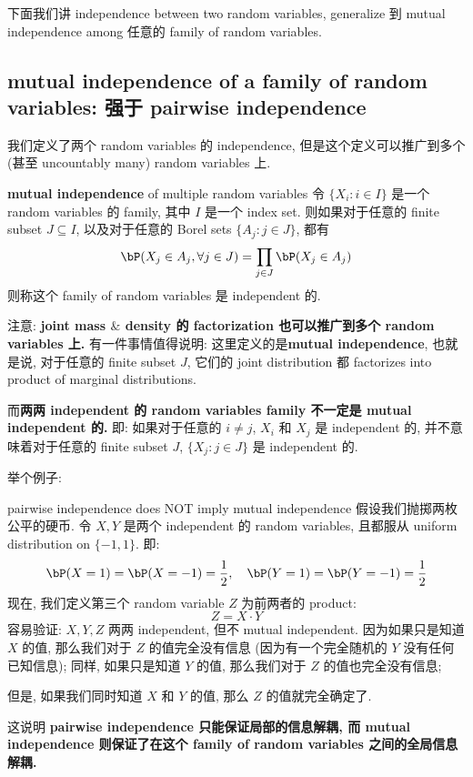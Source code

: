 下面我们讲 independence between two random variables, generalize 
到 mutual independence among 任意的 family of random variables.


\subsection{mutual independence of a family of random variables: 强于 pairwise independence}
我们定义了两个 random variables 的 independence, 
但是这个定义可以推广到多个 (甚至 uncountably many) random variables 上.
\begin{definition}{\textbf{mutual independence} of multiple random variables}
    令 \(\{X_i: i \in I\}\) 是一个 random variables 的 family, 
    其中 \(I\) 是一个 index set. 
    则如果对于任意的 finite subset \(J \subseteq I\), 
    以及对于任意的 Borel sets \(\{A_j: j \in J\}\), 都有
    \[
    \bP(X_j \in A_j, \forall j \in J) = \prod_{j\in J} \bP(X_j \in A_j)
    \]
    则称这个 family of random variables 是 independent 的.
\end{definition}
注意: \textbf{joint mass $\&$ density 的 factorization 也可以推广到多个 random variables 上.} 
有一件事情值得说明: 
这里定义的是\textbf{mutual independence}, 也就是说, 对于任意的 finite subset \(J\),
它们的 joint distribution 都 factorizes into product of marginal distributions.

而\textbf{两两 independent 的 random variables family 不一定是 mutual independent 的.}
即: 如果对于任意的 \(i \neq j\), \(X_i\) 和 \(X_j\) 是 independent 的,
并不意味着对于任意的 finite subset \(J\), \(\{X_j: j \in J\}\) 是 independent 的. 

举个例子: 

\begin{example}{pairwise independence does NOT imply mutual independence}
假设我们抛掷两枚公平的硬币.
令 $X, Y$ 是两个 independent 的 random variables, 
且都服从 uniform distribution on $\{-1, 1\}$. 即:
$$
\bP(X=1) = \bP(X=-1) = \frac{1}{2}, \quad \bP(Y=1) = \bP(Y=-1) = \frac{1}{2}
$$
现在, 我们定义第三个 random variable $Z$ 为前两者的 product:
$$
Z = X \cdot Y
$$
容易验证: $X, Y, Z$ 两两 independent, 但不 mutual independent.
因为如果只是知道 $X$ 的值, 那么我们对于 $Z$ 的值完全没有信息
(因为有一个完全随机的 $Y$ 没有任何已知信息); 同样, 
如果只是知道 $Y$ 的值, 那么我们对于 $Z$ 的值也完全没有信息;

但是, 如果我们同时知道 $X$
和 $Y$ 的值, 那么 $Z$ 的值就完全确定了. 

这说明 \textbf{pairwise independence 只能保证局部的信息解耦, 
而 mutual independence 则保证了在这个 family of random variables 之间的全局信息解耦.}
\end{example}




